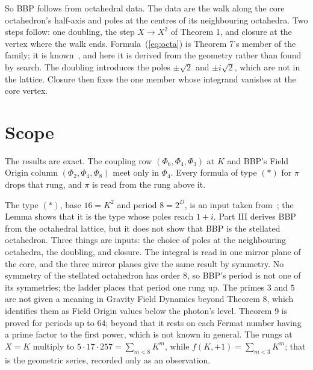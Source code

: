 \documentclass[twocolumn]{iopjournal}
\begin{document}
\medskip
\noindent
So BBP follows from octahedral data. The data are the walk along the
core octahedron's half-axis and poles at the centres of its
neighbouring octahedra. Two steps follow: one doubling, the step
$X \to X^2$ of Theorem 1, and closure at the vertex where the walk
ends. Formula~(\ref{eq:octa}) is Theorem 7's member of the family; it
is known~\cite{AdamchikWagon1997}, and here it is derived from the
geometry rather than found by search. The doubling introduces the
poles $\pm\sqrt2$ and $\pm i\sqrt2$, which are not in the lattice.
Closure then fixes the one member whose integrand vanishes at the core
vertex.


\section*{Scope}

The results are exact. The coupling row
$(\Phi_6, \Phi_4, \Phi_3)$ at $K$ and BBP's Field Origin column
$(\Phi_2, \Phi_4, \Phi_8)$ meet only in $\Phi_4$. Every formula of
type $(\ast)$ for $\pi$ drops that rung, and $\pi$ is read from the
rung above it.

The type $(\ast)$, base $16 = K^2$ and period $8 = 2^D$, is an input
taken from~\cite{Nelson2026bbp}; the Lemma shows that it is the type
whose poles reach $1 + i$. Part III derives BBP from the octahedral
lattice, but it does not show that BBP is the stellated octahedron.
Three things are inputs: the choice of poles at the neighbouring
octahedra, the doubling, and closure. The integral is read in one mirror
plane of the core, and the three mirror planes give the same result by
symmetry. No symmetry of the stellated octahedron has
order $8$, so BBP's period is not one of its symmetries; the ladder
places that period one rung up. The primes $3$ and $5$ are not given
a meaning in Gravity Field Dynamics beyond Theorem 8, which identifies
them as Field Origin values below the photon's level. Theorem 9 is
proved for periods up to $64$; beyond that it rests on each Fermat
number having a prime factor to the first power, which is not known
in general. The rungs at $X = K$ multiply to
$5 \cdot 17 \cdot 257 = \sum_{m<8} K^m$, while $f(K,+1) =
\sum_{m<3} K^m$; that is the geometric series, recorded only as an
observation.

\end{document}
